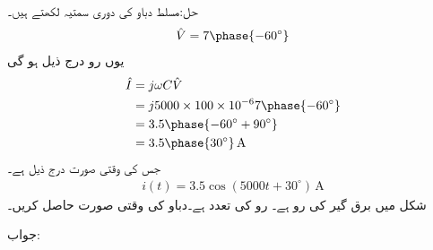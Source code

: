 حل:مسلط دباو کی دوری سمتیہ لکھتے ہیں۔
\begin{align*}
\hat{V}=7\phase{-60^{\circ}}
\end{align*}
یوں رو درج ذیل ہو گی
\begin{align*}
\hat{I}&=j \omega C \hat{V}\\
&=j 5000 \times 100 \times 10^{-6} 7 \phase{-60^{\circ}}\\
&=3.5 \phase{-60^{\circ}+90^{\circ}}\\
&=3.5\phase{30^{\circ}} \, \si{\ampere}
\end{align*}
جس کی وقتی صورت درج ذیل ہے۔
\begin{align*}
i(t)=3.5\cos(5000 t+30^{\circ}) \, \si{\ampere}
\end{align*}
شکل  میں  برق گیر کی رو  ہے۔ رو کی تعدد  ہے۔دباو کی وقتی صورت حاصل کریں۔

جواب:


